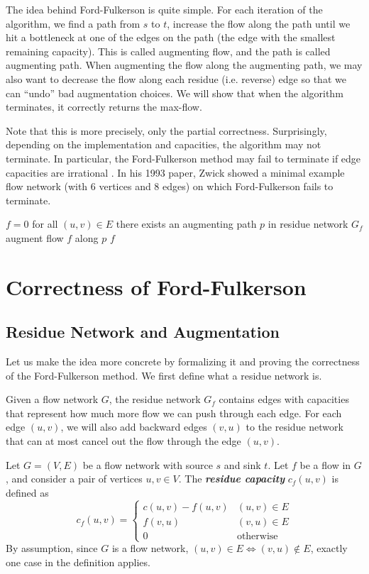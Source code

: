 The idea behind Ford-Fulkerson is quite simple. For each iteration of the algorithm, we find a path from $s$ to $t$, increase the flow along the path until we hit a bottleneck at one of the edges on the path (the edge with the smallest remaining capacity). This is called augmenting flow, and the path is called augmenting path. When augmenting the flow along the augmenting path, we may also want to decrease the flow along each residue (i.e. reverse) edge so that we can ``undo'' bad augmentation choices. We will show that when the algorithm terminates, it correctly returns the max-flow.

Note that this is more precisely, only the partial correctness. Surprisingly, depending on the implementation and capacities, the algorithm may not terminate. In particular, the Ford-Fulkerson method may fail to terminate if edge capacities are irrational \cite{Zwick-FF-Example}. In his 1993 paper, Zwick showed a minimal example flow network (with 6 vertices and 8 edges) on which Ford-Fulkerson fails to terminate.

\begin{codebox}
    \li $f = 0$ for all $(u,v) \in E$ 
    \li \While there exists an augmenting path $p$ in residue network $G_f$ \Do
        \li augment flow $f$ along $p$
    \End
    \li \Return $f$
\end{codebox}

\section{Correctness of Ford-Fulkerson}

\subsection{Residue Network and Augmentation}

Let us make the idea more concrete by formalizing it and proving the correctness of the Ford-Fulkerson method. We first define what a residue network is.

Given a flow network $G$, the residue network $G_f$ contains edges with capacities that represent how much more flow we can push through each edge. For each edge $(u,v)$, we will also add backward edges $(v,u)$ to the residue network that can at most cancel out the flow through the edge $(u,v)$.

\begin{definition} 
    Let $G=(V,E)$ be a flow network with source $s$ and sink $t$. Let $f$ be a flow in $G$, and consider a pair of vertices $u,v \in V$. The \textit{\textbf{residue capacity}} $c_f(u,v)$ is defined as
    $$
    c_f(u,v) = \begin{cases}
        c(u,v) - f(u,v) & (u,v) \in E \\
        f(v,u) & (v,u) \in E \\
        0 & \text{otherwise}
    \end{cases}
    $$
    By assumption, since $G$ is a flow network, $(u,v) \in E \iff (v,u) \not\in E$, exactly one case in the definition applies.
\end{definition}

